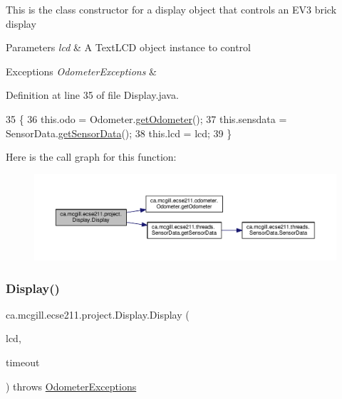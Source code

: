 This is the class constructor for a display object that controls an E\+V3 brick display


\begin{DoxyParams}{Parameters}
{\em lcd} & A Text\+L\+CD object instance to control \\
\hline
\end{DoxyParams}

\begin{DoxyExceptions}{Exceptions}
{\em Odometer\+Exceptions} & \\
\hline
\end{DoxyExceptions}


Definition at line 35 of file Display.\+java.


\begin{DoxyCode}
35                                                         \{
36     this.odo = Odometer.\hyperlink{classca_1_1mcgill_1_1ecse211_1_1odometer_1_1_odometer_a99171f11e34dea918fa9dd069d721439}{getOdometer}();
37     this.sensdata = SensorData.\hyperlink{classca_1_1mcgill_1_1ecse211_1_1threads_1_1_sensor_data_a8260aba53b4474ca1275e4ce26157977}{getSensorData}();
38     this.lcd = lcd;
39   \}
\end{DoxyCode}
Here is the call graph for this function\+:\nopagebreak
\begin{figure}[H]
\begin{center}
\leavevmode
\includegraphics[width=350pt]{classca_1_1mcgill_1_1ecse211_1_1project_1_1_display_af0970123ca090749bfb2f5b9f478c01d_cgraph}
\end{center}
\end{figure}
\mbox{\label{classca_1_1mcgill_1_1ecse211_1_1project_1_1_display_a690cd91bcc8024950c2b8e3b2613c801}} 
\subsubsection{\texorpdfstring{Display()}{Display()}\hspace{0.1cm}{\footnotesize\ttfamily [2/2]}}
{\footnotesize\ttfamily ca.\+mcgill.\+ecse211.\+project.\+Display.\+Display (\begin{DoxyParamCaption}\item[{Text\+L\+CD}]{lcd,  }\item[{long}]{timeout }\end{DoxyParamCaption}) throws \hyperlink{classca_1_1mcgill_1_1ecse211_1_1odometer_1_1_odometer_exceptions}{Odometer\+Exceptions}}

